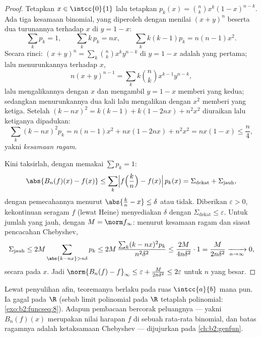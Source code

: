 \begin{proof}
Tetapkan $x \in \intcc{0}{1}$ lalu tetapkan $p_k(x) = \binom nk x^k(1 -
x)^{n-k}$. Ada tiga kesamaan binomial, yang diperoleh dengan menilai
$(x + y)^n$ beserta dua turunannya terhadap $x$ di $y = 1 - x$:
\[
\sum_k p_k = 1,
\qquad
\sum_k k\,p_k = nx,
\qquad
\sum_k k(k-1) p_k = n(n-1)x^2 .
\]
Secara rinci: $(x+y)^n = \sum_k\binom nk x^ky^{n-k}$ di $y = 1-x$
adalah yang pertama; lalu menurunkannya terhadap $x$,
\[
n(x+y)^{n-1} = \sum_k k\binom nk x^{k-1}y^{n-k} ,
\]
lalu mengalikannya dengan $x$ dan mengambil $y = 1 - x$ memberi
yang kedua; sedangkan menurunkannya dua kali lalu mengalikan dengan
$x^2$ memberi yang ketiga. Setelah $(k - nx)^2 = k(k-1) + k(1 - 2nx) +
n^2x^2$ diuraikan lalu ketiganya dipadukan:
\[
\sum_k (k - nx)^2 p_k
= n(n-1)x^2 + nx(1 - 2nx) + n^2x^2
= nx(1 - x) \leq \frac n4 ,
\]
yakni \emph{kesamaan ragam}.

Kini taksirlah, dengan memakai $\sum p_k = 1$:
\[
\abs{B_n(f)(x) - f(x)}
\leq \sum_{k} \Bigl| f\Bigl(\frac kn\Bigr) - f(x)\Bigr|\, p_k(x)
= \Sigma_{\text{dekat}} + \Sigma_{\text{jauh}} ,
\]
dengan pemecahannya menurut $\abs{\frac kn - x} \leq \delta$ atau tidak.
Diberikan $\varepsilon > 0$, kekontinuan seragam $f$ (lewat Heine)
menyediakan $\delta$ dengan $\Sigma_{\text{dekat}} \leq \varepsilon$.
Untuk jumlah yang jauh, dengan $M = \norm f_\infty$: menurut kesamaan
ragam dan siasat pencacahan Chebyshev,
\[
\Sigma_{\text{jauh}} \leq 2M \sum_{\abs{k - nx} > n\delta} p_k
\leq 2M\,\frac{\sum_k (k - nx)^2 p_k}{n^2\delta^2}
\leq \frac{2M}{4 n \delta^2} \cdot 1
= \frac{M}{2n\delta^2}
\xrightarrow[n\to\infty]{} 0 ,
\]
secara  pada $x$. Jadi $\norm{B_n(f) - f}_\infty \leq \varepsilon +
\frac{M}{2n\delta^2} \leq 2\varepsilon$ untuk $n$ yang besar.
\end{proof}

\begin{remark}
Lewat penyulihan afin, teoremanya berlaku pada ruas $\intcc{a}{b}$ mana
pun. Ia gagal pada $\R$ (sebab limit  polinomial pada
$\R$ tetaplah polinomial: \cref{exo:b2:funcseq:8}). Adapun pembacaan
bercorak peluangnya --- yakni $B_n(f)(x)$ merupakan nilai harapan $f$ di
sebuah rata-rata binomial, dan batas ragamnya adalah ketaksamaan
Chebyshev --- dijujurkan pada \cref{ch:b2:genfun}.
\end{remark}

